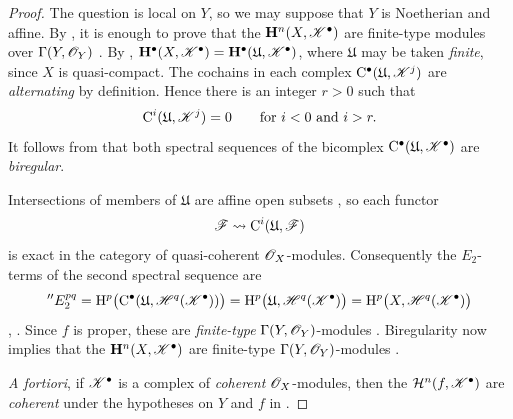 \begin{proof}
The question is local on $Y$, so we may suppose that $Y$ is
Noetherian and affine.  By , it is enough to prove
that the $\mathbf{H}^n(X,\mathscr{K}^\bullet)$ are finite-type modules
over $\Gamma(Y,\mathscr{O}_Y)$ .  By
, $\mathbf{H}^\bullet(X,\mathscr{K}^\bullet)
=
\mathbf{H}^\bullet(\mathfrak{U},\mathscr{K}^\bullet)$,
where $\mathfrak{U}$ may be taken \emph{finite}, since $X$ is
quasi-compact.  The cochains in each complex
$\mathrm{C}^\bullet(\mathfrak{U},\mathscr{K}^j)$ are \emph{alternating} by
definition.  Hence there is an integer $r>0$ such that
\[
  \mathrm{C}^i(\mathfrak{U},\mathscr{K}^j)=0
  \qquad\text{for }i<0\text{ and }i>r.
\]
It follows from  that both spectral sequences of
the bicomplex
$\mathrm{C}^\bullet(\mathfrak{U},\mathscr{K}^\bullet)$ are \emph{biregular}.

Intersections of members of $\mathfrak{U}$ are affine open subsets
, so each functor
\[
  \mathscr{F}\leadsto\mathrm{C}^i(\mathfrak{U},\mathscr{F})
\]
is exact in the category of quasi-coherent $\mathscr{O}_X$-modules.
Consequently the $E_2$-terms of the second spectral sequence are
\[
  ''E_2^{pq}
  =
  \mathrm{H}^p\bigl(
    \mathrm{C}^\bullet(
      \mathfrak{U},\mathscr{H}^q(\mathscr{K}^\bullet)
    )
  \bigr)
  =
  \mathrm{H}^p\bigl(
    \mathfrak{U},\mathscr{H}^q(\mathscr{K}^\bullet)
  \bigr)
  =
  \mathrm{H}^p\bigl(X,\mathscr{H}^q(\mathscr{K}^\bullet)\bigr)
\]
, .  Since $f$ is proper, these
are \emph{finite-type} $\Gamma(Y,\mathscr{O}_Y)$-modules
.  Biregularity now implies that the
$\mathbf{H}^n(X,\mathscr{K}^\bullet)$ are finite-type
$\Gamma(Y,\mathscr{O}_Y)$-modules .

\emph{A fortiori}, if $\mathscr{K}^\bullet$ is a complex of \emph{coherent}
$\mathscr{O}_X$-modules, then the
$\mathcal{H}^n(f,\mathscr{K}^\bullet)$ are \emph{coherent} under the
hypotheses on $Y$ and $f$ in 
.
\end{proof}

